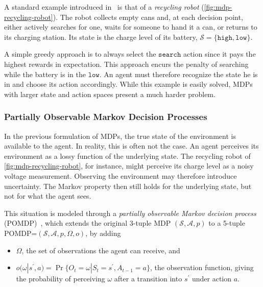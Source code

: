A standard example introduced in~\textcite{sutton_reinforcement_2020} is that of a \emph{recycling robot} (\cref{fig:mdp-recycling-robot}).
The robot collects empty cans and, at each decision point, either actively searches
for one, waits for someone to hand it a can, or returns to its charging station.
Its state is the charge level of its battery, $\mathcal{S}=\{\mathtt{high},\mathtt{low}\}$.



A simple greedy approach is to always select the $\mathtt{search}$ action since it
pays the highest rewards in expectation.
This approach encurs the penalty of searching while the battery is in the $\mathtt{low}$.
An agent must therefore recognize the state he is in and choose its action accordingly.
While this example is easily solved, MDPs with larger state and action spaces present
a much harder problem.

\subsubsection{Partially Observable Markov Decision Processes}\label{sec:rl-pomdp}

In the previous formulation of MDPs, the true state of the environment is available
to the agent.
In reality, this is often not the case.
An agent perceives its environment as a lossy function of the underlying state.
The recycling robot of \cref{fig:mdp-recycling-robot}, for instance, might perceive
its charge level as a noisy voltage measurement.
Observing the environment may therefore introduce uncertainty.
The Markov property then still holds for the underlying state, but not for what the agent sees.

This situation is modeled through a \emph{partially observable Markov decision process}
(POMDP)~\cite{ASTROM1965174,kaelbling_planning_1998}, which
extends the original 3-tuple MDP $(\mathcal{S},\mathcal{A},p)$ to a 5-tuple POMDP=$(\mathcal{S},\mathcal{A},p,\Omega,o)$, by adding

\begin{itemize}
  \item $\Omega$, the set of observations the agent can receive, and
  \item $o(\omega|s^\prime,a)=\Pr\{O_t=\omega|S_t=s^\prime,A_{t-1}=a\}$, the observation
    function, giving the probability of perceiving $\omega$ after a transition into
    $s^\prime$ under action $a$.
\end{itemize}

